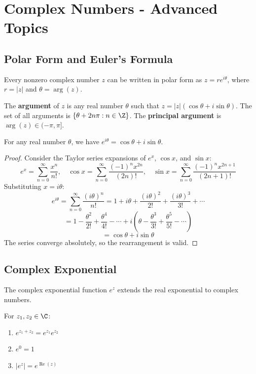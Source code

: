 \chapter{Complex Numbers - Advanced Topics}
\label{ch:complex-advanced}

\section{Polar Form and Euler's Formula}
\label{sec:complex-polar}

Every nonzero complex number $z$ can be written in polar form as $z = r e^{i\theta}$, where $r = |z|$ and $\theta = \arg(z)$.

\begin{definition}[Argument]
\label{def:argument}
The \textbf{argument} of $z$ is any real number $\theta$ such that $z = |z|(\cos \theta + i \sin \theta)$. The set of all arguments is $\{\theta + 2n\pi : n \in \Z\}$. The \textbf{principal argument} is $\arg(z) \in (-\pi, \pi]$.
\end{definition}

\begin{theorem}
\label{thm:euler-formula}
For any real number $\theta$, we have $e^{i\theta} = \cos \theta + i \sin \theta$.
\end{theorem}

\begin{proof}
Consider the Taylor series expansions of $e^x$, $\cos x$, and $\sin x$:
\[ e^x = \sum_{n=0}^\infty \frac{x^n}{n!}, \quad \cos x = \sum_{n=0}^\infty \frac{(-1)^n x^{2n}}{(2n)!}, \quad \sin x = \sum_{n=0}^\infty \frac{(-1)^n x^{2n+1}}{(2n+1)!} \]
Substituting $x = i\theta$:
\[ e^{i\theta} = \sum_{n=0}^\infty \frac{(i\theta)^n}{n!} = 1 + i\theta + \frac{(i\theta)^2}{2!} + \frac{(i\theta)^3}{3!} + \cdots \]
\[ = 1 - \frac{\theta^2}{2!} + \frac{\theta^4}{4!} - \cdots + i\left(\theta - \frac{\theta^3}{3!} + \frac{\theta^5}{5!} - \cdots\right) \]
\[ = \cos \theta + i \sin \theta \]
The series converge absolutely, so the rearrangement is valid.
\end{proof}

\section{Complex Exponential}
\label{sec:complex-exponential}

The complex exponential function $e^z$ extends the real exponential to complex numbers.

\begin{theorem}
\label{thm:complex-exp}
For $z_1, z_2 \in \C$:
\begin{enumerate}
\item $e^{z_1 + z_2} = e^{z_1} e^{z_2}$
\item $e^{0} = 1$
\item $|e^z| = e^{\operatorname{Re}(z)}$
\end{enumerate}
\end{theorem}

